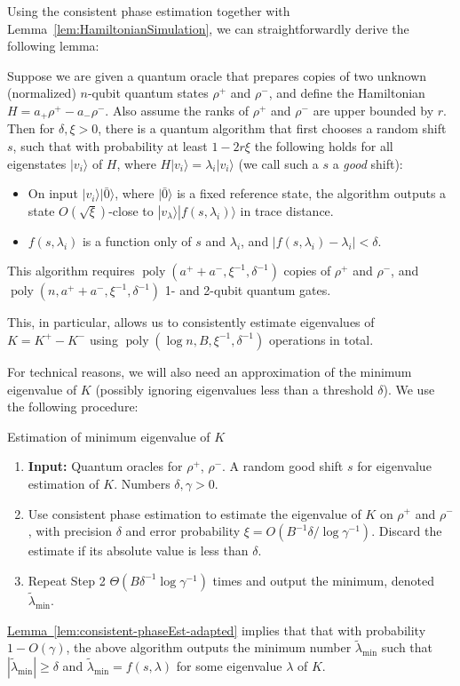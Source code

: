 \documentclass[a4paper,UKenglish,cleveref, autoref]{lipics-v2019}
\theoremstyle{remark}
\numberwithin{equation}{section}
\numberwithin{oracle}{section}
\numberwithin{remark}{section}
\newcommand{\lem}[1]{\hyperref[lem:#1]{Lemma~\ref*{lem:#1}}}
\newcommand{\ket}[1]{|#1\rangle}
\DeclareMathOperator{\poly}{poly}
\begin{document}
Using the consistent phase estimation together with Lemma~\ref{lem:HamiltonianSimulation}, we can straightforwardly derive the following lemma:
\begin{lemma}\label{lem:consistent-phaseEst-adapted}
Suppose we are given a quantum oracle that prepares copies of two unknown (normalized) $n$-qubit quantum states $\rho^+$ and $\rho^-$, and define the Hamiltonian $H = a_+ \rho^+ - a_- \rho^-$. Also assume the ranks of $\rho^+$ and $\rho^-$ are upper bounded by $r$. Then for $\delta,\xi > 0$, there is a quantum algorithm that first chooses a random shift $s$, such that with probability at least $1-2r\xi$ the following holds for all eigenstates $\ket{v_i}$ of $H$, where $H\ket{v_i} = \lambda_i\ket{v_i}$ (we call such a $s$ a \emph{good} shift):
\begin{itemize}
\item On input $\ket{v_i}\ket{\bar{0}}$, where $\ket{\bar{0}}$ is a fixed reference state, the algorithm outputs a state $O(\sqrt{\xi})$-close to $\ket{v_\lambda}\ket{f(s,\lambda_i)}$ in trace distance.
\item $f(s,\lambda_i)$ is a function only of $s$ and $\lambda_i$, and $|f(s,\lambda_i) - \lambda_i| < \delta$.
\end{itemize}
This algorithm requires $\poly(a^++a^-,\xi^{-1},\delta^{-1})$ copies of $\rho^+$ and $\rho^-$, and $\poly(n,a^++a^-,\xi^{-1},\delta^{-1})$ 1- and 2-qubit quantum gates.
\end{lemma}
This, in particular, allows us to consistently estimate eigenvalues of $K = K^+ - K^-$ using $\poly(\log n, B,\xi^{-1},\delta^{-1})$ operations in total.

For technical reasons, we will also need an approximation of the minimum eigenvalue of $K$ (possibly ignoring eigenvalues less than a threshold $\delta$). We use the following procedure:\\
\begin{algorithm}[H]
\caption{Estimation of minimum eigenvalue of $K$}
 \label{algo:lambda_min}
\begin{enumerate}
\item \textbf{Input:} Quantum oracles for $\rho^+$, $\rho^-$. A random good shift $s$ for eigenvalue estimation of $K$. Numbers $\delta, \gamma > 0$.
\item Use consistent phase estimation to estimate the eigenvalue of $K$ on $\rho^+$ and $\rho^-$, with precision $\delta$ and error probability $\xi = O(B^{-1}\delta/\log\gamma^{-1})$. Discard the estimate if its absolute value is less than $\delta$.
\item Repeat Step 2 $\Theta(B\delta^{-1}\log \gamma^{-1})$ times and output the minimum, denoted $\tilde{\lambda}_{\min}$.
\end{enumerate}
\end{algorithm}
\lem{consistent-phaseEst-adapted} implies that that with probability $1 - O(\gamma)$, the above algorithm outputs the minimum number $\tilde{\lambda}_{\text{min}}$ such that $|\tilde{\lambda}_{\text{min}}| \ge \delta$ and $\tilde{\lambda}_{\text{min}} = f(s,\lambda)$ for some eigenvalue $\lambda$ of $K$.
\end{document}
